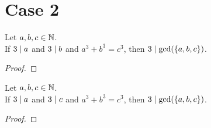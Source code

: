 %
%
%
%

\chapter*{Case 2}

\begin{lemma}
    \label{lmm:three_dvd_gcd_of_dvd_a_of_dvd_b}
    \leanok
    Let $a, b, c \in \mathbb{N}$. \\
    If $3 \mid a$ and $3 \mid b$ and $a ^ 3 + b ^ 3 = c ^ 3$, then $3 \mid \gcd(\left\{a, b, c\right\})$.
\end{lemma}
\begin{proof}
    \leanok
\end{proof}

\begin{lemma}
    \label{lmm:three_dvd_gcd_of_dvd_a_of_dvd_c}
    \leanok
    Let $a, b, c \in \mathbb{N}$. \\
    If $3 \mid a$ and $3 \mid c$ and $a ^ 3 + b ^ 3 = c ^ 3$, then $3 \mid \gcd(\left\{a, b, c\right\})$.
\end{lemma}
\begin{proof}
    \leanok
\end{proof}


